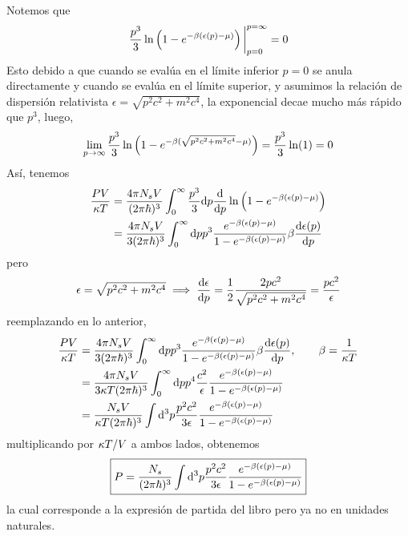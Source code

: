 \begin{sol}
 Notemos que
\begin{equation}\label{int-partes}
  \eval{\frac{p^3}{3}\ln\left(1-e^{-\b(\epsilon(p)-\m )}\right)}_{p=0}^{p=\infty}=0
\end{equation}
Esto debido a que cuando se evalúa en el límite inferior $p=0$ se anula directamente y cuando se evalúa en el límite superior, y asumimos la relación de dispersión relativista $\epsilon=\sqrt{p^2c^2+m^2c^4}$, la exponencial decae mucho más rápido que $p^3$, luego,
\begin{equation}
  \lim_{p\to \infty}\frac{p^3}{3}\ln\left(1-e^{-\beta(\sqrt{p^2c^2+m^2c^4}-\mu )}\right)=\frac{p^3}{3}\ln(1)=0
\end{equation}
Así, tenemos
\begin{align}
   \frac{PV}{\kappa T}&=\frac{4\pi N_sV}{(2\pi\hbar)^3}\int_0^\infty \frac{p^3}{3}\dd p\dv{p}\ln\left(1-e^{-\beta(\epsilon(p)-\mu )}\right)\\
   &=\frac{4\pi N_sV}{3(2\pi\hbar)^3}\int_0^\infty \dd pp^3\frac{e^{-\beta (\epsilon(p)-\mu )}}{1-e^{-\beta (\epsilon(p)-\mu )}}\beta \dv{\epsilon(p)}{p}
\end{align}
pero
\begin{equation}\label{dedp}
  \epsilon=\sqrt{p^2c^2+m^2c^4}\implies \dv{\epsilon}{p}=\frac{1}{2}\frac{2pc^2}{\sqrt{p^2c^2+m^2c^4}}=\frac{pc^2}{\epsilon}
\end{equation}
reemplazando en lo anterior,
\begin{align}
  \frac{PV}{\kappa T}&=\frac{4\pi N_sV}{3(2\pi\hbar)^3}\int_0^\infty \dd pp^3\frac{e^{-\beta (\epsilon(p)-\mu )}}{1-e^{-\beta (\epsilon(p)-\mu )}}\beta \dv{\epsilon(p)}{p},\qquad \beta=\frac{1}{\kappa T}\\
  &=\frac{4\pi N_sV}{3\kappa T(2\pi\hbar)^3}\int_0^\infty\dd p p^4\frac{c^2}{\epsilon}\frac{e^{-\beta (\epsilon(p)-\mu )}}{1-e^{-\beta (\epsilon(p)-\mu )}}\\
  &=\frac{N_sV}{\kappa T(2\pi\hbar)^3}\int\dd^3p\frac{p^2c^2}{3\epsilon}\frac{e^{-\beta (\epsilon(p)-\mu )}}{1-e^{-\beta (\epsilon(p)-\mu )}}
\end{align}
multiplicando por $\kappa T/V$ a ambos lados, obtenemos
\begin{equation}\label{27-P}
  \boxed{P=\frac{N_s}{(2\pi\hbar)^3}\int\dd^3p\frac{p^2c^2}{3\epsilon}\frac{e^{-\beta (\epsilon(p)-\mu )}}{1-e^{-\beta (\epsilon(p)-\mu )}}}
\end{equation}
la cual corresponde a la expresión de partida del libro pero ya no en unidades naturales.




\end{sol}
